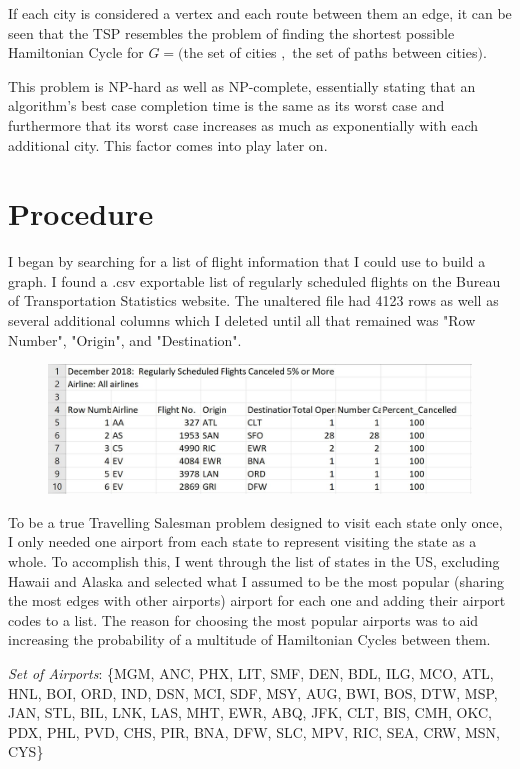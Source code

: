 \documentclass[12pt]{article}
\begin{document}
\pagebreak

If each city is considered a vertex and each route between them an edge,
it can be seen that the TSP resembles the problem of finding the shortest
possible Hamiltonian Cycle for \(G = (\)the set of cities $,$ the set of
paths between cities$)$.

This problem is NP-hard as well as NP-complete, essentially stating that
an algorithm's best case completion time is the same as its worst case and
furthermore that its worst case increases as much as exponentially with
each additional city. This factor comes into play later on.

\section*{Procedure} 
I began by searching for a list of flight information that I could use to
build a graph. I found a .csv exportable list of regularly scheduled flights
on the Bureau of Transportation Statistics website. The unaltered file had 4123
rows as well as several additional columns which I deleted until all that
remained was "Row Number", "Origin", and "Destination". 

\begin{figure}[h]
       \includegraphics{originaldata}
       \centering
\end{figure}

To be a true Travelling Salesman problem designed to visit each state only
once, I only needed one airport from each state to represent visiting the
state as a whole. To accomplish this, I went through the list of states in
the US, excluding Hawaii and Alaska and selected what I assumed to be the
most popular (sharing the most edges with other airports) airport for each
one and adding their airport codes to a list. The reason for choosing the 
most popular airports was to aid increasing the probability of a multitude
of Hamiltonian Cycles between them.

\pagebreak
\begin{center}
       \textit{Set of Airports}: \{MGM, ANC,
       PHX,
       LIT,
       SMF,
       DEN,
       BDL,
       ILG,
       MCO,
       ATL,
       HNL,
       BOI,
       ORD,
       IND,
       DSN,
       MCI,
       SDF,
       MSY,
       AUG,
       BWI,
       BOS,
       DTW,
       MSP,
       JAN,
       STL,
       BIL,
       LNK,
       LAS,
       MHT,
       EWR,
       ABQ,
       JFK,
       CLT,
       BIS,
       CMH,
       OKC,
       PDX,
       PHL,
       PVD,
       CHS,
       PIR,
       BNA,
       DFW,
       SLC,
       MPV,
       RIC,
       SEA,
       CRW,
       MSN,
       CYS\} 
\end{center}
\end{document}
